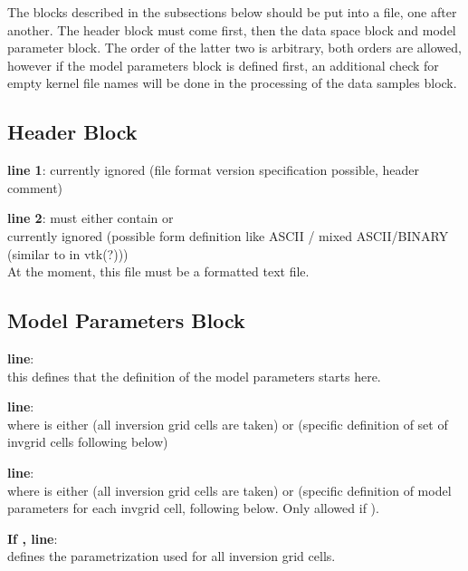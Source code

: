 The blocks described in the subsections below should be put into a file, one after another. The header block must come
first, then the data space block and model parameter block. The order of the latter two is arbitrary, both orders are 
allowed, however if the model parameters block is defined first, an additional check for empty kernel file names will
be done in the processing of the data samples block.

\subsection{Header Block}
{\bf line 1}: currently ignored (file format version specification possible, header comment)

{\bf line 2}: must either contain  or \\
currently ignored (possible form definition like ASCII / mixed ASCII/BINARY (similar to in vtk(?)))\\
At the moment, this file must be a formatted text file. 
\subsection{Model Parameters Block}

{\bf line}: \\
this defines that the definition of the model parameters starts here.

{\bf line}: \\
where  is either  (all inversion grid cells are taken) or  
(specific definition of set of invgrid cells following below)

{\bf line}: \\
where  is either  (all inversion grid cells are taken) or  
(specific definition of model parameters for each invgrid cell, following below. Only allowed if 
). 

{\bf If , line}: \\
defines the parametrization used for all inversion grid cells.

